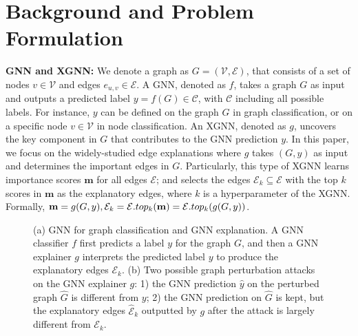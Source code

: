\section{Background and Problem Formulation}
\label{sec:background}


{\bf GNN and XGNN:} 
 We denote a graph as ${G} = (\mathcal{V}, \mathcal{E})$, that consists of a set of nodes $v \in \mathcal{V}$ and edges $e_{u,v} \in \mathcal{E}$. A GNN, denoted as $f$, takes a graph $G$ as input and outputs a predicted label $y = f(G) \in \mathcal{C}$, with $\mathcal{C}$ including all possible labels. For instance, $y$ can be defined on the graph $G$ in graph classification, or on a specific node $v \in \mathcal{V}$ in node classification. An XGNN, denoted as $g$, uncovers the key component in $G$ that contributes to the GNN prediction $y$. In this paper, we focus on the widely-studied edge explanations where $g$ takes $(G,y)$ as input and determines the important edges in $G$. Particularly, this type of XGNN  learns importance scores $\mathbf{m}$ for all edges $\mathcal{E}$; and selects the edges $\mathcal{E}_k \subseteq \mathcal{E}$ with the top $k$ scores in $\mathbf{m}$ as the explanatory edges, where $k$ is a hyperparameter of the XGNN. Formally, ${\bf m} = g(G,y), \mathcal{E}_k = \mathcal{E}.top_{k}({\bf m}) = \mathcal{E}.top_{k}(g(G,y))$. 

\begin{figure}[!t]
\vspace{-4mm}
    \centering
    \captionsetup[subfloat]{labelsep=none, format=plain, labelformat=empty}

    \hfil
    \vspace{-2mm}
    \caption{(a) GNN for graph classification and GNN explanation. 
    A GNN classifier $f$ first predicts a label $y$ for the graph $G$, and then a GNN explainer $g$ interprets the predicted label $y$ to produce the explanatory edges $\mathcal{E}_k$. 
    (b) Two possible graph perturbation attacks on the GNN explainer $g$: 1) the GNN prediction $\hat{y}$ on the perturbed graph $\hat{G}$ is different from $y$; 
    2) the GNN prediction on $\hat{G}$ is kept, but the explanatory edges $\hat{\mathcal{E}}_k$ outputted by $g$ after the attack is largely different from $\mathcal{E}_k$.
    }
    \label{fig:Explanation}
    \vspace{-4mm}
\end{figure}


